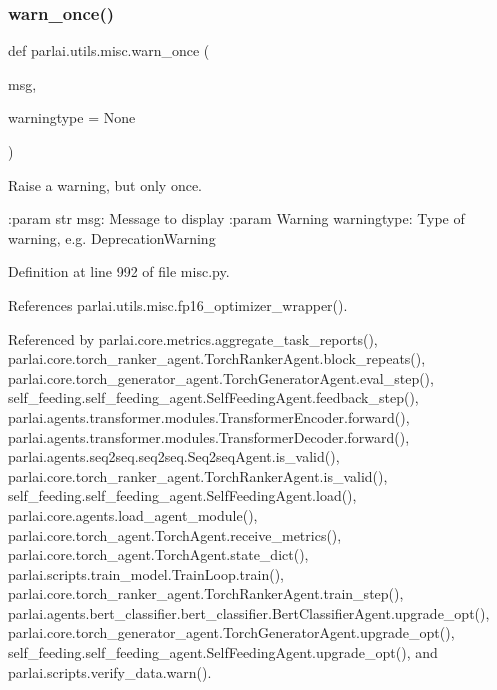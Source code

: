\subsubsection{\texorpdfstring{warn\+\_\+once()}{warn\_once()}}
{\footnotesize\ttfamily def parlai.\+utils.\+misc.\+warn\+\_\+once (\begin{DoxyParamCaption}\item[{}]{msg,  }\item[{}]{warningtype = {\ttfamily None} }\end{DoxyParamCaption})}

\begin{DoxyVerb}Raise a warning, but only once.

:param str msg: Message to display
:param Warning warningtype: Type of warning, e.g. DeprecationWarning
\end{DoxyVerb}
 

Definition at line 992 of file misc.\+py.



References parlai.\+utils.\+misc.\+fp16\+\_\+optimizer\+\_\+wrapper().



Referenced by parlai.\+core.\+metrics.\+aggregate\+\_\+task\+\_\+reports(), parlai.\+core.\+torch\+\_\+ranker\+\_\+agent.\+Torch\+Ranker\+Agent.\+block\+\_\+repeats(), parlai.\+core.\+torch\+\_\+generator\+\_\+agent.\+Torch\+Generator\+Agent.\+eval\+\_\+step(), self\+\_\+feeding.\+self\+\_\+feeding\+\_\+agent.\+Self\+Feeding\+Agent.\+feedback\+\_\+step(), parlai.\+agents.\+transformer.\+modules.\+Transformer\+Encoder.\+forward(), parlai.\+agents.\+transformer.\+modules.\+Transformer\+Decoder.\+forward(), parlai.\+agents.\+seq2seq.\+seq2seq.\+Seq2seq\+Agent.\+is\+\_\+valid(), parlai.\+core.\+torch\+\_\+ranker\+\_\+agent.\+Torch\+Ranker\+Agent.\+is\+\_\+valid(), self\+\_\+feeding.\+self\+\_\+feeding\+\_\+agent.\+Self\+Feeding\+Agent.\+load(), parlai.\+core.\+agents.\+load\+\_\+agent\+\_\+module(), parlai.\+core.\+torch\+\_\+agent.\+Torch\+Agent.\+receive\+\_\+metrics(), parlai.\+core.\+torch\+\_\+agent.\+Torch\+Agent.\+state\+\_\+dict(), parlai.\+scripts.\+train\+\_\+model.\+Train\+Loop.\+train(), parlai.\+core.\+torch\+\_\+ranker\+\_\+agent.\+Torch\+Ranker\+Agent.\+train\+\_\+step(), parlai.\+agents.\+bert\+\_\+classifier.\+bert\+\_\+classifier.\+Bert\+Classifier\+Agent.\+upgrade\+\_\+opt(), parlai.\+core.\+torch\+\_\+generator\+\_\+agent.\+Torch\+Generator\+Agent.\+upgrade\+\_\+opt(), self\+\_\+feeding.\+self\+\_\+feeding\+\_\+agent.\+Self\+Feeding\+Agent.\+upgrade\+\_\+opt(), and parlai.\+scripts.\+verify\+\_\+data.\+warn().

